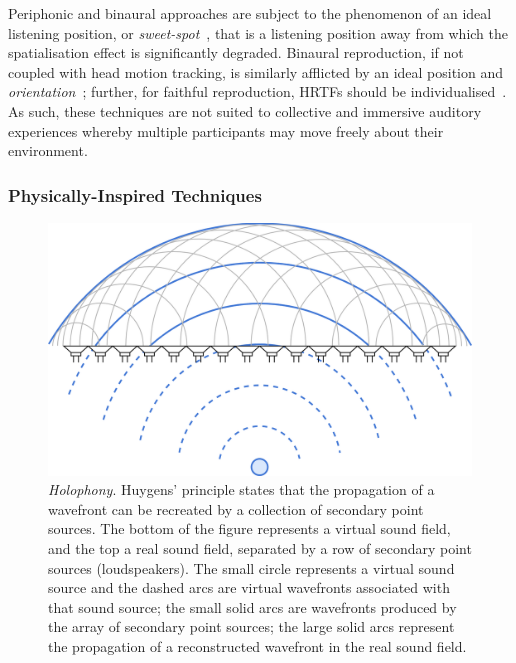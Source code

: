 
Periphonic and binaural approaches are subject to the phenomenon of an ideal
listening position, or \textit{sweet-spot}~\citep{nicol_sound_2017}, that is a
listening position away from which the spatialisation effect is significantly
degraded.
Binaural reproduction, if not coupled with head motion tracking, is similarly
afflicted by an ideal position and
\textit{orientation}~\citep{verheijen_sound_1998};
further, for faithful reproduction, HRTFs should be
individualised~\citep{de_poli_physically_1998}.
As such, these techniques are not suited to collective and immersive auditory
experiences whereby multiple participants may move freely about their
environment.



\subsubsection{Physically-Inspired Techniques}\label{subsubsec:sound-field-synthesis}

\begin{figure}[ht]
    \centering
    \includegraphics[width=.75\textwidth]{figures/wfs_1}
    \caption{\textit{Holophony}.
    Huygens' principle states that the propagation of a wavefront
    can be recreated by a collection of secondary point sources.
    The bottom of the figure represents a virtual sound field, and the top a
    real sound field, separated by a row of secondary point sources
        (loudspeakers).
        The small circle represents a virtual sound source and the dashed arcs
        are virtual wavefronts associated with that sound source;
        the small solid arcs are wavefronts produced by the array of secondary
        point sources;
        the large solid arcs represent the propagation of a reconstructed
        wavefront in the real sound field.}
    \label{fig:wfs_1}
\end{figure}

